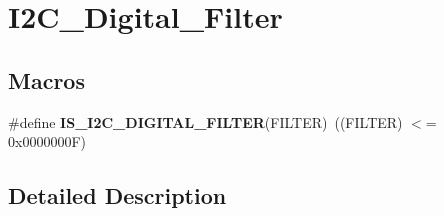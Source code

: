 \hypertarget{group___i2_c___digital___filter}{}\section{I2\+C\+\_\+\+Digital\+\_\+\+Filter}
\label{group___i2_c___digital___filter}
\subsection*{Macros}
\begin{DoxyCompactItemize}
\item 
\mbox{\label{group___i2_c___digital___filter_gac10d26772d885184a7a30d9a2adee453}} 
\#define {\bfseries I\+S\+\_\+\+I2\+C\+\_\+\+D\+I\+G\+I\+T\+A\+L\+\_\+\+F\+I\+L\+T\+ER}(F\+I\+L\+T\+ER)~((F\+I\+L\+T\+ER) $<$= 0x0000000\+F)
\end{DoxyCompactItemize}


\subsection{Detailed Description}
